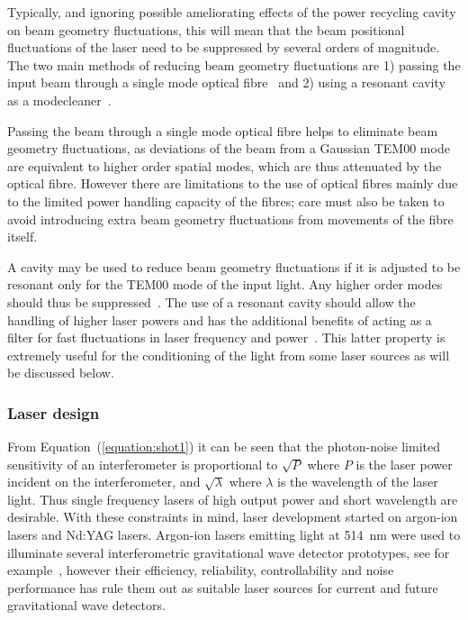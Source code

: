 \documentclass{article}
\begin{document}
\begin{itemize}
Typically, and ignoring possible ameliorating effects of the power recycling
cavity on beam geometry fluctuations, this will mean that the beam positional
fluctuations of the laser need to be suppressed by several orders of magnitude.
The two main methods of reducing beam geometry fluctuations are 1) passing the
input beam through a single mode optical fibre~\cite{Meersphd} and 2) using a
resonant cavity as a modecleaner~\cite{Rudiger, Skeldon, Willke, Araya}.

Passing the beam through a single mode optical fibre helps to eliminate beam
geometry fluctuations, as deviations of the beam from a Gaussian TEM00 mode are
equivalent to higher order spatial modes, which are thus attenuated by the
optical fibre.  However there are limitations to the use of optical fibres
mainly due to the limited power handling capacity of the fibres; care must also
be taken to avoid introducing extra beam geometry fluctuations from movements of
the fibre itself.

A cavity may be used to reduce beam geometry fluctuations if it is adjusted to
be resonant only for the TEM00 mode of the input light. Any higher order modes
should thus be suppressed~\cite{Rudiger}. The use of a resonant cavity should
allow the handling of higher laser powers and has the additional benefits of
acting as a filter for fast fluctuations in laser frequency and
power~\cite{Skeldon, Willke}. This latter property is extremely useful for the
conditioning of the light from some laser sources as will be discussed below.
\end{itemize}


\subsubsection{Laser design}
\label{subsubsection:laserdesign}

From Equation~(\ref{equation:shot1}) it can be seen that the photon-noise
limited sensitivity of an interferometer is proportional to $\sqrt{P}$ where $P$
is the laser power incident on the interferometer, and $\sqrt{\lambda}$ where
$\lambda$ is the wavelength of the laser light. Thus single frequency lasers of
high output power and short wavelength are desirable. With these constraints in
mind, laser development started on argon-ion lasers and Nd:YAG lasers. 
Argon-ion lasers emitting light at 514~nm were used to illuminate several
interferometric gravitational wave detector prototypes, see for
example~\cite{Shoemaker, Robertson}, however their efficiency, reliability,
controllability and noise performance has rule them out as suitable laser
sources for current and future gravitational wave detectors.
\end{document}
